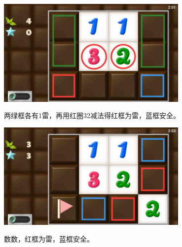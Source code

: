 \subsection{} %
\begin{center}
    \includegraphics[width=0.7\textwidth]{puzzlelow/24-1.jpg}
\end{center}
两绿框各有1雷，再用红圈32减法得红框为雷，蓝框安全。
\begin{center}
    \includegraphics[width=0.7\textwidth]{puzzlelow/24-2.jpg}
\end{center}
数数，红框为雷，蓝框安全。


